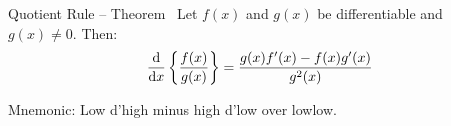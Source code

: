 \begin{frame}[t]
\label<1|handout:1>{2.4 quot}
\label<2|handout:1>{2.6 quot}
\label<4|handout:1>{2.6 quot2}
\begin{block}{Quotient Rule -- Theorem~}
Let $f(x)$ and $g(x)$ be differentiable and $g(x) \neq 0$. Then:
\[\frac{\text{d}}{\text{d}x}\left\{\frac{f(x)}{g(x)} \right\} = \frac{g(x)f'(x)-f(x)g'(x)}{g^2(x)}\]
\end{block}
Mnemonic: Low d'high minus high d'low over lowlow. \vfill\pause

\begin{QuestionSet}
%
\end{QuestionSet}
\end{frame}

